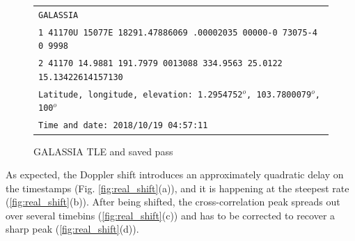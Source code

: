 \begin{figure}[ht!]
\begin{tabular}{ l }
\texttt{GALASSIA }\\
\texttt{1 41170U 15077E   18291.47886069  .00002035  00000-0  73075-4 0  9998 }\\
\texttt{2 41170  14.9881 191.7979 0013088 334.9563  25.0122 15.13422614157130}\\
\texttt{Latitude, longitude, elevation: 1.2954752$^o$, 103.7800079$^o$, 100$^o$ }\\
\texttt{Time and date: 2018/10/19 04:57:11}

\end{tabular}
\caption{GALASSIA TLE and saved pass}
\label{fig:TLE}
\end{figure}

\noindent As expected, the Doppler shift introduces an approximately quadratic delay on the timestamps (Fig. \ref{fig:real_shift}(a)), and it is happening at the steepest rate (\ref{fig:real_shift}(b)). After being shifted, the cross-correlation peak spreads out over several timebins (\ref{fig:real_shift}(c)) and has to be corrected to recover a sharp peak (\ref{fig:real_shift}(d)).

